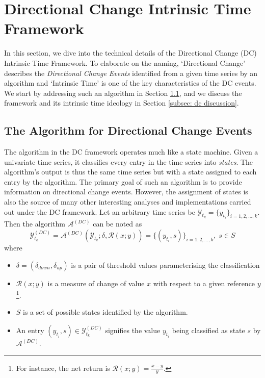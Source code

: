 \section{Directional Change Intrinsic Time Framework}

In this section, we dive into the technical details of the Directional Change (DC) Intrinsic Time Framework. To elaborate on the naming, `Directional Change' describes the \textit{Directional Change Events} identified from a given time series by an algorithm and `Intrinsic Time' is one of the key characteristics of the DC events. We start by addressing such an algorithm in Section \ref{subsec: dc algo}, and we discuss the framework and its intrinsic time ideology in Section \ref{subsec: dc discussion}.

\subsection{The Algorithm for Directional Change Events}\label{subsec: dc algo}
The algorithm in the DC framework operates much like a state machine. Given a univariate time series, it classifies every entry in the time series into \textit{states}. The algorithm's output is thus the same time series but with a state assigned to each entry by the algorithm. The primary goal of such an algorithm is to provide information on directional change events. However, the assignment of states is also the source of many other interesting analyses and implementations carried out under the DC framework. Let an arbitrary time series be $\mathcal{Y}_{t_k} = \{y_{t_i} \}_{i = 1, 2, \ldots, k}$. Then the algorithm $\mathcal{A}^{(DC)}$ can be noted as
\begin{equation*}
    \mathcal{Y}_{t_k}^{(DC)} = \mathcal{A}^{(DC)} (\mathcal{Y}_{t_k} ; \delta, \mathcal{R} (x; y)) = \{ (y_{t_i}, s)\}_{i = 1, 2, \ldots, k}, \; s \in S
\end{equation*}
where
\begin{itemize}
    \setlength\itemsep{-5pt}
    \item $\delta = (\delta_{down}, \delta_{up})$ is a pair of threshold values parameterising the classification
    \item $\mathcal{R} (x; y)$ is a measure of change of value $x$ with respect to a given reference $y$\footnote{For instance, the net return is $\mathcal{R} (x; y) = \frac{x - y}{y}$.}.
    \item $S$ is a set of possible states identified by the algorithm. 
    \item An entry $(y_{t_i}, s) \in \mathcal{Y}_{t_k}^{(DC)}$ signifies the value $y_{t_i}$ being classified as state $s$ by $\mathcal{A}^{(DC)}$.
\end{itemize}

